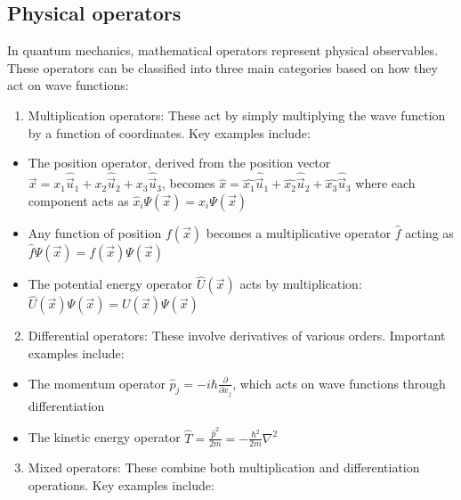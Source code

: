 \documentclass[italian]{HKNdocument}
\begin{document}
\subsection{Physical operators}
In quantum mechanics, mathematical operators represent physical observables. These operators can be classified into three main categories based on how they act on wave functions:

\begin{enumerate}
  \item Multiplication operators: These act by simply multiplying the wave function by a function of coordinates. Key examples include:
\end{enumerate}

\begin{itemize}
  \item The position operator, derived from the position vector $\vec{x}=x_{1} \hat{\vec{u}}_{1}+x_{2} \hat{\vec{u}}_{2}+x_{3} \hat{\vec{u}}_{3}$, becomes $\hat{x}=\hat{x_{1}} \hat{\vec{u}}_{1}+\hat{x_{2}} \hat{\vec{u}}_{2}+\hat{x_{3}} \hat{\vec{u}}_{3}$ where each component acts as $\hat{x}_i\Psi(\vec{x}) = x_i\Psi(\vec{x})$
  \item Any function of position $f(\vec{x})$ becomes a multiplicative operator $\hat{f}$ acting as $\hat{f}\Psi(\vec{x}) = f(\vec{x})\Psi(\vec{x})$
  \item The potential energy operator $\hat{U}(\vec{x})$ acts by multiplication: $\hat{U}(\vec{x})\Psi(\vec{x}) = U(\vec{x})\Psi(\vec{x})$
\end{itemize}

\begin{enumerate}
  \setcounter{enumi}{1}
  \item Differential operators: These involve derivatives of various orders. Important examples include:
\end{enumerate}

\begin{itemize}
  \item The momentum operator $\hat{p}_{j}=-i \hbar \frac{\partial}{\partial x_{j}}$, which acts on wave functions through differentiation
  \item The kinetic energy operator $\hat{T} = \frac{\hat{p}^2}{2m} = -\frac{\hbar^2}{2m}\nabla^2$
\end{itemize}


\begin{enumerate}
  \setcounter{enumi}{2}
  \item Mixed operators: These combine both multiplication and differentiation operations. Key examples include:
\end{enumerate}
\end{document}
